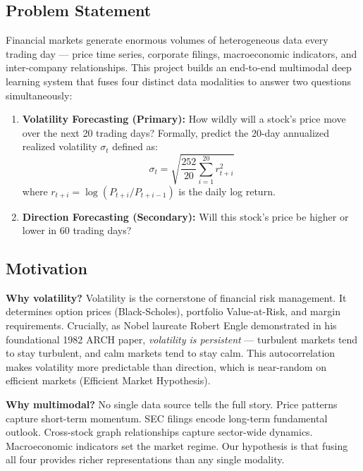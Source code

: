 \documentclass[12pt,a4paper]{article}
\begin{document}
\subsection{Problem Statement}

Financial markets generate enormous volumes of heterogeneous data every trading day --- price time series, corporate filings, macroeconomic indicators, and inter-company relationships. This project builds an end-to-end multimodal deep learning system that fuses four distinct data modalities to answer two questions simultaneously:

\begin{enumerate}
    \item \textbf{Volatility Forecasting (Primary):} How wildly will a stock's price move over the next 20 trading days? Formally, predict the 20-day annualized realized volatility $\sigma_t$ defined as:
    \begin{equation}
        \sigma_t = \sqrt{\frac{252}{20} \sum_{i=1}^{20} r_{t+i}^2}
    \end{equation}
    where $r_{t+i} = \log(P_{t+i}/P_{t+i-1})$ is the daily log return.

    \item \textbf{Direction Forecasting (Secondary):} Will this stock's price be higher or lower in 60 trading days?
\end{enumerate}

\subsection{Motivation}

\textbf{Why volatility?} Volatility is the cornerstone of financial risk management. It determines option prices (Black-Scholes), portfolio Value-at-Risk, and margin requirements. Crucially, as Nobel laureate Robert Engle demonstrated in his foundational 1982 ARCH paper, \textit{volatility is persistent} --- turbulent markets tend to stay turbulent, and calm markets tend to stay calm. This autocorrelation makes volatility more predictable than direction, which is near-random on efficient markets (Efficient Market Hypothesis).

\textbf{Why multimodal?} No single data source tells the full story. Price patterns capture short-term momentum. SEC filings encode long-term fundamental outlook. Cross-stock graph relationships capture sector-wide dynamics. Macroeconomic indicators set the market regime. Our hypothesis is that fusing all four provides richer representations than any single modality.
\end{document}
